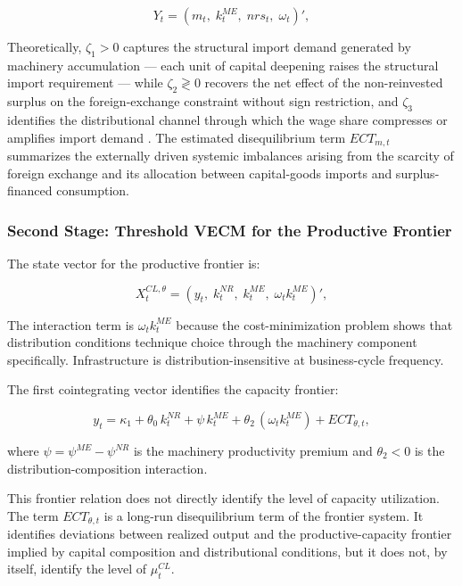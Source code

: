 \documentclass[11pt,a4paper]{article}
\begin{document}
{\begin{equation}
	Y_t
	=
	\left(
	m_t,\;
	k_t^{ME},\;
	nrs_t,\;
	\omega_t
	\right)',
	\label{eq:cl:state_vector_imports}
\end{equation}

Theoretically, $\zeta_1 > 0$ captures the structural import demand
generated by machinery accumulation --- each unit of capital deepening
raises the structural import requirement --- while $\zeta_2 \gtrless 0$
recovers the net effect of the non-reinvested surplus on the
foreign-exchange constraint without sign restriction, and $\zeta_3$
identifies the distributional channel through which the wage share
compresses or amplifies import demand \citep{Kaldor1959}. The estimated
disequilibrium term $ECT_{m,t}$ summarizes the externally driven
systemic imbalances arising from the scarcity of foreign exchange and
its allocation between capital-goods imports and surplus-financed
consumption.

\subsubsection{Second Stage: Threshold VECM for the Productive Frontier}
\label{subsec:chile_frontier_threshold}

The state vector for the productive frontier is:

\begin{equation}
	X_t^{CL,\theta}
	=
	\left(
	y_t,\;
	k_t^{NR},\;
	k_t^{ME},\;
	\omega_t k_t^{ME}
	\right)',
	\label{eq:cl:state_vector_frontier}
\end{equation}

The interaction term is $\omega_t k_t^{ME}$ because the
cost-minimization problem shows that distribution conditions technique
choice through the machinery component specifically. Infrastructure is
distribution-insensitive at business-cycle frequency.

The first cointegrating vector identifies the capacity frontier:

\begin{equation}
	y_t
	=
	\kappa_1
	+
	\theta_0\, k_t^{NR}
	+
	\psi\, k_t^{ME}
	+
	\theta_2\,(\omega_t k_t^{ME})
	+
	ECT_{\theta,t},
	\label{eq:cl:cv1}
\end{equation}

where $\psi = \psi^{ME}-\psi^{NR}$ is the machinery productivity
premium and $\theta_2 < 0$ is the distribution-composition interaction.

This frontier relation does not directly identify the level of capacity
utilization. The term $ECT_{\theta,t}$ is a long-run disequilibrium
term of the frontier system. It identifies deviations between realized
output and the productive-capacity frontier implied by capital
composition and distributional conditions, but it does not, by itself,
identify the level of $\mu_t^{CL}$.

}
\end{document}
